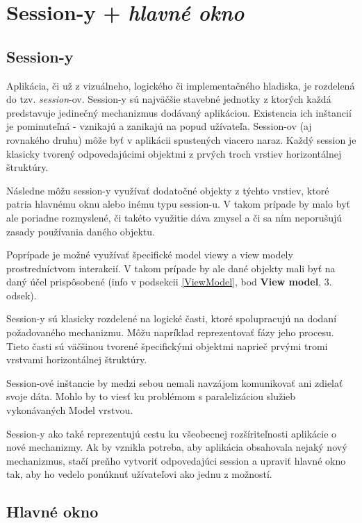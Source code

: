 \section{Session-y + \textit{hlavné okno}}\label{Sessions}

\subsection{Session-y}

Aplikácia, či už z vizuálneho, logického či implementačného hladiska, je rozdelená do tzv. \textit{session}-ov. Session-y sú najväčšie stavebné jednotky z ktorých každá predstavuje jedinečný mechanizmus dodávaný aplikáciou. Existencia ich inštancií je pominuteľná - vznikajú a zanikajú na popud užívateľa. Session-ov (aj rovnakého druhu) môže byť v aplikácii spustených viacero naraz. Každý session je klasicky tvorený odpovedajúcimi objektmi z prvých troch vrstiev horizontálnej štruktúry. 

Následne môžu session-y využívať dodatočné objekty z týchto vrstiev, ktoré patria hlavnému oknu alebo inému typu session-u. V takom prípade by malo byť ale poriadne rozmyslené, či takéto  využitie dáva zmysel a či sa ním neporušujú zasady používania daného objektu. 

Poprípade je možné využívať špecifické model viewy a view modely prostredníctvom interakcií. V takom prípade by ale dané objekty mali byť na daný účel prispôsobené (info v podsekcii \ref{ViewModel}, bod \textbf{View model}, 3. odsek).

Session-y sú klasicky rozdelené na logické časti, ktoré spolupracujú na dodaní požadovaného mechanizmu. Môžu napríklad reprezentovať fázy jeho procesu. Tieto časti sú väčšinou tvorené špecifickými objektmi naprieč prvými tromi vrstvami horizontálnej štruktúry. 

Session-ové inštancie by medzi sebou nemali navzájom komunikovať ani zdielať svoje dáta. Mohlo by to viesť ku problémom s paralelizáciou služieb vykonávaných Model vrstvou.

Session-y ako také reprezentujú cestu ku všeobecnej rozšíriteľnosti aplikácie o nové mechanizmy. Ak by vznikla potreba, aby aplikácia obsahovala nejaký nový mechanizmus, stačí preňho vytvoriť odpovedajúci session a upraviť hlavné okno tak, aby ho vedelo ponúknuť užívateľovi ako jednu z možností.  

\subsection{Hlavné okno}\label{Hlavne_okno_obecne}

